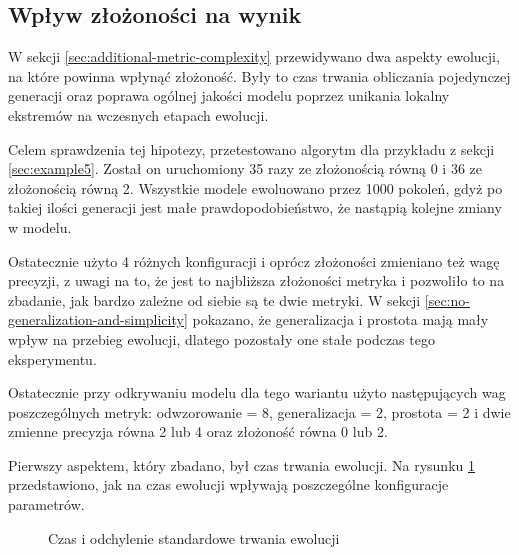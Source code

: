 \subsection{Wpływ złożoności na wynik}
W sekcji \ref{sec:additional-metric-complexity} przewidywano dwa aspekty ewolucji, na które powinna wpłynąć złożoność. Były to czas trwania obliczania pojedynczej generacji oraz poprawa ogólnej jakości modelu poprzez unikania lokalny ekstremów na wczesnych etapach ewolucji. 

Celem sprawdzenia tej hipotezy, przetestowano algorytm dla przykładu z sekcji \ref{sec:example5}. Został on  uruchomiony 35 razy ze złożonością równą 0 i 36 ze złożonością równą 2. Wszystkie modele ewoluowano przez 1000 pokoleń, gdyż po takiej ilości generacji jest małe prawdopodobieństwo, że nastąpią kolejne zmiany w modelu. 

Ostatecznie użyto 4 różnych konfiguracji i oprócz złożoności zmieniano też wagę precyzji, z uwagi na to, że jest to najbliższa złożoności metryka i pozwoliło to na zbadanie, jak bardzo zależne od siebie są te dwie metryki. W sekcji \ref{sec:no-generalization-and-simplicity} pokazano, że generalizacja i prostota mają mały wpływ na przebieg ewolucji, dlatego pozostały one stałe podczas tego eksperymentu.

Ostatecznie przy odkrywaniu modelu dla tego wariantu użyto następujących wag poszczególnych metryk: odwzorowanie = 8, generalizacja = 2, prostota = 2 i dwie zmienne precyzja równa 2 lub 4 oraz złożoność równa 0 lub 2. 

Pierwszy aspektem, który zbadano, był czas trwania ewolucji. Na rysunku \ref{fig:total_timemulti4} przedstawiono, jak na czas ewolucji wpływają poszczególne konfiguracje parametrów.  

\begin{figure}[H]
	\caption{\label{fig:total_timemulti4}Czas i odchylenie standardowe trwania ewolucji}
\end{figure}

